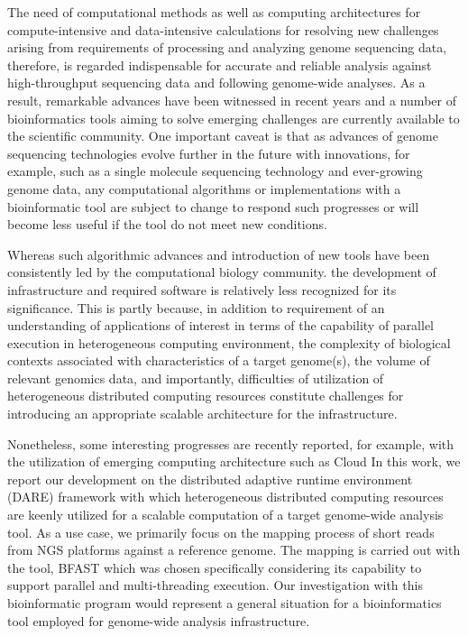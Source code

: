 \documentclass[12pt]{article}
\begin{document}
The need of computational methods as well as computing architectures for compute-intensive and data-intensive calculations for resolving new challenges arising from requirements of processing and analyzing genome sequencing data, therefore, is regarded indispensable for accurate and reliable analysis against high-throughput sequencing data and following genome-wide analyses.  As a result, remarkable advances have been witnessed in recent years and a number of bioinformatics tools aiming to solve emerging challenges are currently available to the scientific community\cite{trapnell2009,bfast2009,scheibye-alsing2009,pepke2009,samtools}.  One important caveat is that as advances of genome sequencing technologies evolve further in the future with innovations, for example, such as a single molecule sequencing technology and ever-growing genome data, any computational algorithms or implementations with a bioinformatic tool are subject to change to respond such progresses or will become less useful if the tool do not meet new conditions. 

Whereas such algorithmic advances and introduction of new tools have been consistently led by the computational biology community. the development of infrastructure and required software is relatively less recognized for its significance.  This is partly because, in addition to requirement of an understanding of applications of interest in terms of the capability of parallel execution in heterogeneous computing environment, the complexity of biological contexts associated with characteristics of a target genome(s), the volume of relevant genomics data, and importantly, difficulties of utilization of heterogeneous distributed computing resources constitute challenges for introducing an appropriate scalable architecture for the infrastructure.

Nonetheless, some interesting progresses are recently reported, for example, with the utilization of emerging computing architecture such as Cloud\cite{taylor2010}  In this work, we report our development on the distributed adaptive runtime environment (DARE) framework with which heterogeneous distributed computing resources are keenly utilized for a scalable computation of a target genome-wide analysis tool.  As a use case, we primarily focus on the mapping process of short reads from NGS platforms against a reference genome.  The mapping is carried out with the tool, BFAST\cite{bfast2009, bfast2009b} which was chosen specifically considering its capability to support parallel and multi-threading execution.  Our investigation with this bioinformatic program would represent a general situation for a bioinformatics tool employed for genome-wide analysis infrastructure.
\end{document}
